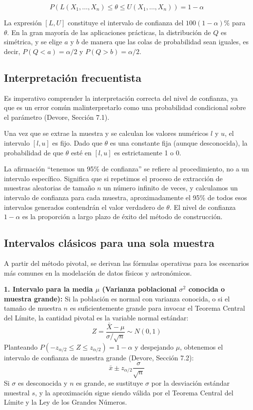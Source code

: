 $$ P(L(X_1, \dots, X_n) \le \theta \le U(X_1, \dots, X_n)) = 1 - \alpha $$

La expresión $[L, U]$ constituye el intervalo de confianza del $100(1-\alpha)\%$ para $\theta$. En la gran mayoría de las aplicaciones prácticas, la distribución de $Q$ es simétrica, y se elige $a$ y $b$ de manera que las colas de probabilidad sean iguales, es decir, $P(Q < a) = \alpha/2$ y $P(Q > b) = \alpha/2$.

\subsection{Interpretación frecuentista}

Es imperativo comprender la interpretación correcta del nivel de confianza, ya que es un error común malinterpretarlo como una probabilidad condicional sobre el parámetro (Devore, Sección 7.1). 

Una vez que se extrae la muestra y se calculan los valores numéricos $l$ y $u$, el intervalo $[l, u]$ es fijo. Dado que $\theta$ es una constante fija (aunque desconocida), la probabilidad de que $\theta$ esté en $[l, u]$ es estrictamente 1 o 0. 

La afirmación ``tenemos un 95\% de confianza'' se refiere al procedimiento, no a un intervalo específico. Significa que si repetimos el proceso de extracción de muestras aleatorias de tamaño $n$ un número infinito de veces, y calculamos un intervalo de confianza para cada muestra, aproximadamente el 95\% de todos esos intervalos generados contendrán el valor verdadero de $\theta$. El nivel de confianza $1-\alpha$ es la proporción a largo plazo de éxito del método de construcción.

\subsection{Intervalos clásicos para una sola muestra}

A partir del método pivotal, se derivan las fórmulas operativas para los escenarios más comunes en la modelación de datos físicos y astronómicos.

\textbf{1. Intervalo para la media $\mu$ (Varianza poblacional $\sigma^2$ conocida o muestra grande):}
Si la población es normal con varianza conocida, o si el tamaño de muestra $n$ es suficientemente grande para invocar el Teorema Central del Límite, la cantidad pivotal es la variable normal estándar:
$$ Z = \frac{\bar{X} - \mu}{\sigma / \sqrt{n}} \sim N(0, 1) $$
Planteando $P(-z_{\alpha/2} \le Z \le z_{\alpha/2}) = 1 - \alpha$ y despejando $\mu$, obtenemos el intervalo de confianza de muestra grande (Devore, Sección 7.2):
$$ \bar{x} \pm z_{\alpha/2} \frac{\sigma}{\sqrt{n}} $$
Si $\sigma$ es desconocida y $n$ es grande, se sustituye $\sigma$ por la desviación estándar muestral $s$, y la aproximación sigue siendo válida por el Teorema Central del Límite y la Ley de los Grandes Números.

